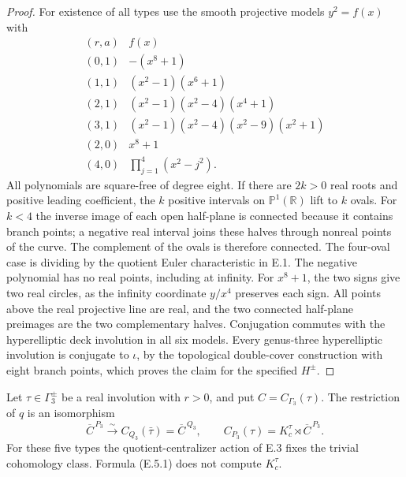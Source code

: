 \begin{proof}
For existence of all types use the smooth projective models
$y^2=f(x)$ with
\[
\begin{array}{c|c}
 (r,a)&f(x)\\\hline
 (0,1)&-(x^8+1)\\
 (1,1)&(x^2-1)(x^6+1)\\
 (2,1)&(x^2-1)(x^2-4)(x^4+1)\\
 (3,1)&(x^2-1)(x^2-4)(x^2-9)(x^2+1)\\
 (2,0)&x^8+1\\
 (4,0)&\displaystyle\prod_{j=1}^4(x^2-j^2).
\end{array}                                                   \tag{E.4.3}
\]
All polynomials are square-free of degree eight.  If there
are $2k>0$ real roots and positive leading coefficient, the
$k$ positive intervals on $\mathbb P^1(\mathbb R)$ lift to
$k$ ovals.  For $k<4$ the inverse image of each open
half-plane is connected because it contains branch points;
a negative real interval joins these halves through nonreal
points of the curve.  The complement of the ovals is
therefore connected.  The four-oval case is dividing by the
quotient Euler characteristic in E.1.  The negative polynomial
has no real points, including at infinity.  For $x^8+1$, the
two signs give two real circles, as the infinity coordinate
$y/x^4$ preserves each sign.  All points above the real
projective line are real, and the two connected half-plane
preimages are the two complementary halves.  Conjugation
commutes with the hyperelliptic deck involution in all six
models.  Every genus-three hyperelliptic involution is
conjugate to $\iota$, by the topological double-cover
construction with eight branch points, which proves the
claim for the specified $H^{\pm}$.
\end{proof}

Let $\tau\in\Gamma_3^{\pm}$ be a real involution with $r>0$,
and put $C=C_{\Gamma_3}(\tau)$.  The restriction of $q$ is an
isomorphism
\[
 \overline C^{\,P_3}\xrightarrow{\sim}
 C_{Q_3}(\bar\tau)=\overline C^{\,Q_3},\qquad
 C_{P_3}(\tau)=K_c^\tau\rtimes\overline C^{\,P_3}.           \tag{E.5.1}
\]
For these five types the quotient-centralizer action of E.3
fixes the trivial cohomology class.  Formula (E.5.1) does not
compute $K_c^\tau$.

